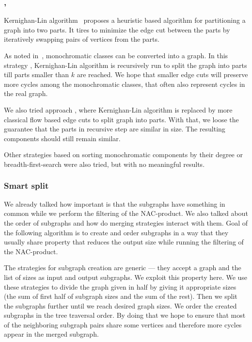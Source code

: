 
\subsubsection{\KernighanLin{}, \Cuts{}}

Kernighan-Lin algorithm~\cite{kernighan_lin} proposes a heuristic based algorithm
for partitioning a graph into two parts. It tires to minimize the edge cut between
the parts by iteratively swapping pairs of vertices from the parts.

As noted in~,
monochromatic classes can be converted into a graph.
In this strategy \KernighanLin{},
Kernighan-Lin algorithm is recursively run to split the graph into parts till
parts smaller than \( k \) are reached.
We hope that smaller edge cuts will preserve more cycles among
the monochromatic classes, that often also represent cycles in the real graph.

We also tried approach \Cuts{}, where Kernighan-Lin algorithm is replaced by
more classical flow based edge cuts to split graph into parts.
With that, we loose the guarantee that the parts in recursive step
are similar in size. The resulting components should still remain similar.

Other strategies based on
sorting monochromatic components by their degree
or breadth-first-search were also tried,
but with no meaningful results.

\subsubsection{Smart split}%
\label{sec:smart_split}

We already talked how important is that the subgraphs have something in common
while we perform the filtering of the NAC-product. We also talked about the order of
subgraphs and how do merging strategies interact with them.
Goal of the following algorithm is to create and order subgraphs in a way that they usually
share property that reduces the output size while running
the filtering of the NAC-product.

The strategies for subgraph creation are generic --- they accept a graph and
the list of sizes as input and output subgraphs. We exploit this property here. We use
these strategies to divide the graph given in half by giving it appropriate
sizes (the sum of first half of subgraph sizes and the sum of the rest).
Then we split the subgraphs further until we reach desired graph sizes.
We order the created subgraphs in the tree traversal order.
By doing that we hope to ensure that most of the neighboring subgraph pairs share
some vertices and therefore more cycles appear in the merged subgraph.

